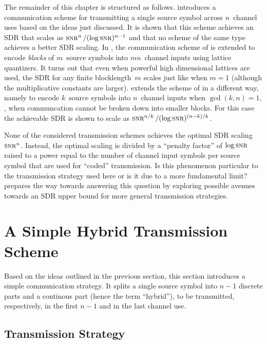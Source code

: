 The remainder of this chapter is structured as follows. 
introduces a communication scheme for transmitting a single source symbol across
$n$~channel uses based on the ideas just discussed. It is shown that this scheme
achieves an SDR that scales as $\snr^n / (\log\snr)^{n-1}$ and that no scheme of
the same type achieves a better SDR scaling. In , the
communication scheme of  is extended to encode \emph{blocks}
of $m$~source symbols into $mn$~channel inputs using lattice quantizers.  It
turns out that even when powerful high dimensional lattices are used, the SDR
for any finite blocklength~$m$ scales just like when $m = 1$ (although the
multiplicative constants are larger).  extends the scheme of
 in a different way, namely to encode $k$~source symbols
into $n$~channel inputs when $\gcd(k,n) = 1$, \ie, when communcation cannot be
broken down into smaller blocks. For this case the achievable SDR is shown to
scale as $\snr^{n/k}/(\log\snr)^{(n-k)/k}$. 

None of the considered transmission schemes achieves the optimal SDR
scaling~$\snr^n$. Instead, the optimal scaling is divided by a ``penalty
factor'' of $\log\snr$ raised to a power equal to the number of channel input
symbols per source symbol that are used for ``coded'' transmission. Is this
phenomenon particular to the transmission strategy used here or is it due to a
more fundamental limit?  prepares the way towards answering
this question by exploring possible avenues towards an SDR upper bound for more
general transmission strategies. 




\section{A Simple Hybrid Transmission Scheme}\label{sec:scalarquant}

Based on the ideas outlined in the previous section, this section
introduces a simple communication strategy. It splits a single source symbol
into $n-1$ discrete parts and a continous part (hence the term ``hybrid''), to
be transmitted, respectively, in the first $n-1$ and in the last channel use. 


\subsection{Transmission Strategy}\label{sec:commscheme}

